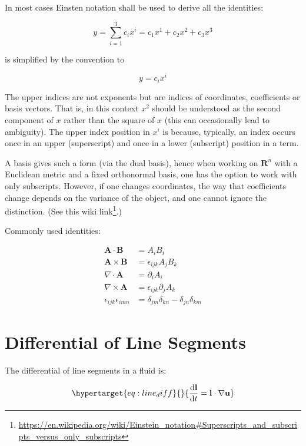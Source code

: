 \documentclass[
  notoc %
]{tufte-book}
\DeclareRobustCommand{\href}[2]{#2\footnote{\url{#1}}}
\begin{document}
In most cases Einsten notation shall be used to derive all the
identities:

\[
y = \sum_{i=1}^3 c_i x^i = c_1 x^1 + c_2 x^2 + c_3 x^3
\]

is simplified by the convention to

\[
y = c_i x^i
\]

The upper indices are not exponents but are indices of coordinates,
coefficients or basis vectors. That is, in this context \(x^2\) should
be understood as the second component of \(x\) rather than the square of
\(x\) (this can occasionally lead to ambiguity). The upper index
position in \(x^i\) is because, typically, an index occurs once in an
upper (superscript) and once in a lower (subscript) position in a term.

A basis gives such a form (via the dual basis), hence when working on
\(\mathbf{R}^n\) with a Euclidean metric and a fixed orthonormal basis,
one has the option to work with only subscripts. However, if one changes
coordinates, the way that coefficients change depends on the variance of
the object, and one cannot ignore the distinction. (See this
\href{https://en.wikipedia.org/wiki/Einstein_notation\#Superscripts_and_subscripts_versus_only_subscripts}{wiki
link}.)

Commonly used identities:

\[
\begin{aligned}
\mathbf{A}\cdot\mathbf{B} &= A_i B_i \\
\mathbf{A}\times\mathbf{B} &= \epsilon_{ijk}A_j B_k \\
\nabla\cdot\mathbf{A} &= \partial_i A_i \\
\nabla\times\mathbf{A} &= \epsilon_{ijk}\partial_j A_k \\
\epsilon_{ijk}\epsilon_{imn} &= \delta_{jm}\delta_{kn} - \delta_{jn}\delta_{km}
\end{aligned}
\]

\hypertarget{differential-of-line-segments}{%
\section{Differential of Line
Segments}\label{differential-of-line-segments}}

The differential of line segments in a fluid is:

\begin{equation}\protect\hypertarget{eq:line_diff}{}{
\frac{\mathrm{d}\mathbf{l}}{\mathrm{d}t} = \mathbf{l}\cdot\nabla\mathbf{u}
}\label{eq:line_diff}\end{equation}
\end{document}
